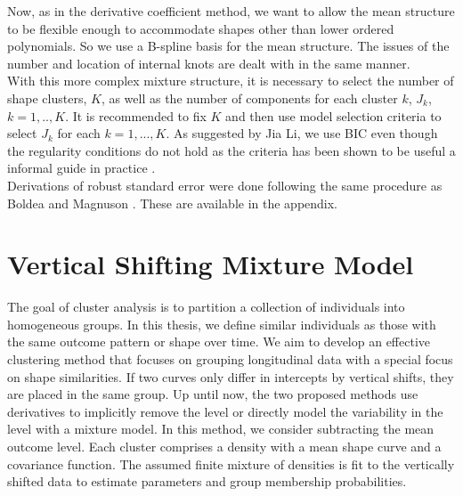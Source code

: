 \documentclass[12pt]{article}
\begin{document}
Now, as in the derivative coefficient method, we want to allow the mean structure to be flexible enough to accommodate shapes other than lower ordered polynomials. So we use a B-spline basis for the mean structure. The issues of the number and location of internal knots are dealt with in the same manner.\\

With this more complex mixture structure, it is necessary to select the number of shape clusters, $K$, as well as the number of components for each cluster $k$, $J_{k}$, $k=1,..,K$. It is recommended to fix $K$ and then use model selection criteria to select $J_{k}$ for each $k=1,...,K$. As suggested by Jia Li, we use BIC even though the regularity conditions do not hold as the criteria has been shown to be useful a informal guide in practice \cite{li2005}.\\

Derivations of robust standard error  were done following the same procedure as Boldea and Magnuson \cite{boldea2009}. These are available in the appendix.

\section{Vertical Shifting Mixture Model}
The goal of cluster analysis is to partition a collection of individuals into homogeneous groups. In this thesis, we define similar individuals as those with the same outcome pattern or shape over time. We aim to develop an effective clustering method that focuses on grouping longitudinal data with a special focus on shape similarities. If two curves only differ in intercepts by vertical shifts, they are placed in the same group. Up until now, the two proposed methods use derivatives to implicitly remove the level or directly model the variability in the level with a mixture model.  In this method, we consider subtracting the mean outcome level. Each cluster comprises a density with a mean shape curve and a covariance function. The assumed finite mixture of densities is fit to the vertically shifted data to estimate parameters and group membership probabilities. 
\end{document}
